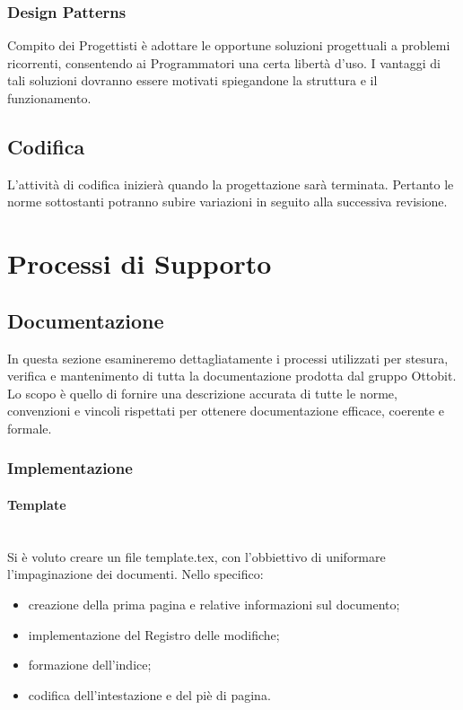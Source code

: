 \documentclass[11pt,a4paper]{article}
\begin{document}
	\subsubsection{Design Patterns} Compito dei Progettisti è adottare le opportune soluzioni progettuali a problemi ricorrenti, consentendo ai Programmatori una certa libertà d'uso. I vantaggi di tali soluzioni dovranno essere motivati spiegandone la struttura e il funzionamento.
	
	\subsection{Codifica}
	L'attività di codifica inizierà quando la progettazione sarà terminata. Pertanto
	le norme sottostanti potranno subire variazioni in seguito alla successiva revisione.

	
	\newpage
	\section{Processi di Supporto}
	
	\subsection{Documentazione}\label{c}
	In questa sezione esamineremo dettagliatamente i processi utilizzati per stesura, verifica e mantenimento di tutta la documentazione prodotta dal gruppo Ottobit.
	Lo scopo è quello di fornire una descrizione accurata di tutte le norme, convenzioni e vincoli rispettati per ottenere documentazione efficace, coerente e formale.
	\subsubsection{Implementazione}
	
	\paragraph{Template}
	\noindent \\ 
	Si è voluto creare un file template.tex, con l'obbiettivo di uniformare l'impaginazione dei documenti. 
	Nello specifico:
	\begin{itemize}
		\item{creazione della prima pagina e relative informazioni sul documento;}
		\item{implementazione del Registro delle modifiche;}
		\item{formazione dell'indice;}
		\item {codifica dell'intestazione e del piè di pagina.}
		
	\end{itemize}
\end{document}
